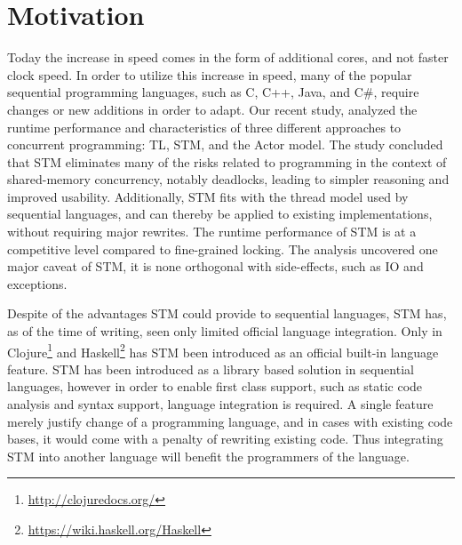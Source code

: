 \makeatletter {}\makeatother
{}
%
\section{Motivation}
Today the increase in  speed comes in the form of additional cores, and not faster clock speed\cite{sutter2005free}. In order to utilize this increase in speed, many of the popular sequential programming languages, such as C, C++, Java, and C\#, require changes or new additions in order to adapt\cite[p. 56]{sutter2005software}. Our recent study\cite{dpt907e14trending}, analyzed the runtime performance and characteristics of three different approaches to concurrent programming: \ac{TL}, \ac{STM}, and the Actor model. The study concluded that \ac{STM} eliminates many of the risks related to programming in the context of shared-memory concurrency, notably deadlocks, leading to simpler reasoning and improved usability. Additionally, \ac{STM} fits with the thread model used by sequential languages, and can thereby be applied to existing implementations, without requiring major rewrites. The runtime performance of \ac{STM} is at a competitive level compared to fine-grained locking\cite{dpt907e14trending}. The analysis uncovered one major caveat of \ac{STM}, it is none orthogonal with side-effects, such as \ac{IO} and exceptions\cite{dpt907e14trending}.

Despite of the advantages \ac{STM} could provide to sequential languages, \ac{STM} has, as of the time of writing, seen only limited official language integration. Only in Clojure\footnote{\url{http://clojuredocs.org/}} and Haskell\footnote{\url{https://wiki.haskell.org/Haskell}} has \ac{STM} been introduced as an official built-in language feature. \ac{STM} has been introduced as a library based solution in sequential languages, however in order to enable first class support, such as static code analysis and syntax support, language integration is required.  A single feature merely justify change of a programming language, and in cases with existing code bases, it would come with a penalty of rewriting existing code. Thus integrating \ac{STM} into another language will benefit the programmers of the language.

